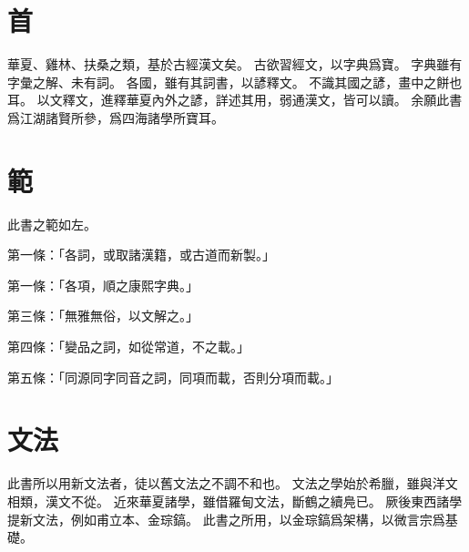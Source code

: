 \section{首}
華夏、雞林、扶桑之類，基於古經漢文矣。
古欲習經文，以字典爲寶。
字典雖有字彙之解、未有詞。
各國，雖有其詞書，以諺釋文。
不識其國之諺，畫中之餅也耳。
以文釋文，進釋華夏內外之諺，詳述其用，弱通漢文，皆可以讀。
余願此書爲江湖諸賢所參，爲四海諸學所寶耳。
\section{範}
此書之範如左。
\par 第一條：「各詞，或取諸漢籍，或古道而新製。」
\par 第一條：「各項，順之康熙字典。」
\par 第三條：「無雅無俗，以文解之。」
\par 第四條：「變品之詞，如從常道，不之載。」
\par 第五條：「同源同字同音之詞，同項而載，否則分項而載。」
\section{文法}
此書所以用新文法者，徒以舊文法之不調不和也。
文法之學始於希臘，雖與洋文相類，漢文不從。
近來華夏諸學，雖借羅甸文法，斷鶴之續鳧已。
厥後東西諸學提新文法，例如甫立本、金琮鎬。
此書之所用，以金琮鎬爲架構，以微言宗爲基礎。
